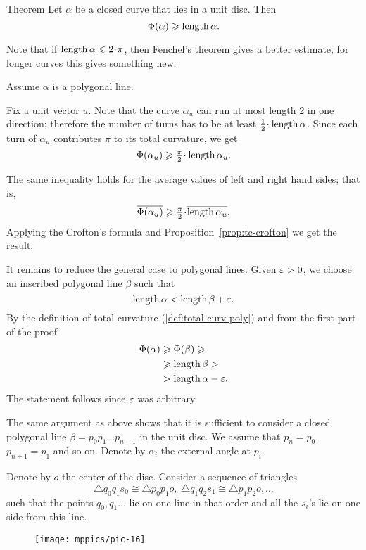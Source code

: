 \begin{thm}{Theorem}\label{thm:DNA}
Let $\alpha$ be a closed curve that lies in a unit disc.
Then 
\[\Phi({\alpha})\geqslant \mathop{\rm length}\nolimits\alpha.\]
\end{thm}

Note that if $\length\alpha\le2\cdot\pi$, then Fenchel's theorem gives a better estimate,
for longer curves this gives something new.

Assume $\alpha$ is a polygonal line.

Fix a unit vector $u$.
Note that the curve $\alpha_u$ can run at most length 2 in one direction;
therefore the number of turns has to be at least $\tfrac12\cdot\length\alpha$.
Since each turn of $\alpha_u$ contributes $\pi$ to its total curvature, we get
\[\tc{\alpha_u}\ge \tfrac\pi2\cdot\length\alpha_u.\]

The same inequality holds for the average values of left and right hand sides;
that is,
\[\overline{\tc{\alpha_u}}
\ge \tfrac\pi2\cdot\overline{\length\alpha_u}.\]
Applying the Crofton's formula and Proposition~\ref{prop:tc-crofton} we get the result.

It remains to reduce the general case to polygonal lines. 
Given $\varepsilon>0$, we choose an inscribed polygonal line $\beta$ such that 
\[\mathop{\rm length}\nolimits \alpha<\mathop{\rm length}\nolimits \beta+\varepsilon.\]
By the definition of total curvature (\ref{def:total-curv-poly}) and from the first part of the proof
\begin{align*}
\Phi({\alpha})&\geqslant\Phi({\beta})\geqslant
\\
&\geqslant \mathop{\rm length}\nolimits\beta>
\\
&>\mathop{\rm length}\nolimits\alpha-\varepsilon.
\end{align*}
The statement follows since $\varepsilon$ was arbitrary. 
\qeds

The same argument as above shows that it is sufficient to consider a closed polygonal line $\beta=p_0p_1\dots p_{n-1}$ in the unit disc.
We assume that $p_n=p_0$, $p_{n+1}=p_1$ and so on.
Denote by $\alpha_i$ the external angle at $p_i$.

Denote by $o$ the center of the disc.
Consider a sequence of triangles 
\[\triangle q_0q_1s_0\cong \triangle p_0p_1o,\ \triangle q_1q_2s_1\cong \triangle p_1p_2o,\dots\]
such that the points $q_0,q_1\dots$ lie on one line in that order and all the $s_i$'s lie on one side from this line.

\begin{figure}[h]
\vskip-0mm
\centering
\texttt{[image: mppics/pic-16]}
\vskip0mm
\end{figure}

